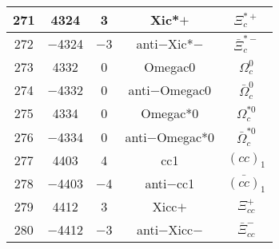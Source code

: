 \documentclass{article}
\begin{document}
\begin{table}[!htbp]
\begin{tabular}{|c|c|c|c|c|}
\hline
271 & 4324 & 3 & Xi\underline{\hspace{0.6em}}c*$+$ & $\Xi_{c}^{*+}$ \\
\hline
272 & $-$4324 & $-$3 & anti$-$Xi\underline{\hspace{0.6em}}c*$-$ & $\bar{\Xi}_{c}^{*-}$ \\
\hline
273 & 4332 & 0 & Omega\underline{\hspace{0.6em}}c0 & $\Omega_{c}^{0}$ \\
\hline
274 & $-$4332 & 0 & anti$-$Omega\underline{\hspace{0.6em}}c0 & $\bar{\Omega}_{c}^{0}$ \\
\hline
275 & 4334 & 0 & Omega\underline{\hspace{0.6em}}c*0 & $\Omega_{c}^{*0}$ \\
\hline
276 & $-$4334 & 0 & anti$-$Omega\underline{\hspace{0.6em}}c*0 & $\bar{\Omega}_{c}^{*0}$ \\
\hline
277 & 4403 & 4 & cc\underline{\hspace{0.6em}}1 & $(cc)_{1}$ \\
\hline
278 & $-$4403 & $-$4 & anti$-$cc\underline{\hspace{0.6em}}1 & $\bar{(cc)}_{1}$ \\
\hline
279 & 4412 & 3 & Xi\underline{\hspace{0.6em}}cc$+$ & $\Xi_{cc}^{+}$ \\
\hline
280 & $-$4412 & $-$3 & anti$-$Xi\underline{\hspace{0.6em}}cc$-$ & $\bar{\Xi}_{cc}^{-}$ \\
\hline
\end{tabular}
\end{table}

\clearpage
\end{document}
